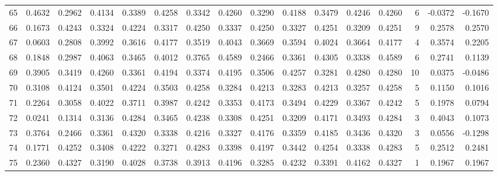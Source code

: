 \begin{tabular}{lrrrrrrrrrrrrrrr}
65  &      0.4632 &  0.2962 &  0.4134 &  0.3389 &  0.4258 &  0.3342 &  0.4260 &  0.3290 &  0.4188 &  0.3479 &   0.4246 &     0.4260 &      6 &                   -0.0372 &                    -0.1670 \\
66  &      0.1673 &  0.4243 &  0.3324 &  0.4224 &  0.3317 &  0.4250 &  0.3337 &  0.4250 &  0.3327 &  0.4251 &   0.3209 &     0.4251 &      9 &                    0.2578 &                     0.2570 \\
67  &      0.0603 &  0.2808 &  0.3992 &  0.3616 &  0.4177 &  0.3519 &  0.4043 &  0.3669 &  0.3594 &  0.4024 &   0.3664 &     0.4177 &      4 &                    0.3574 &                     0.2205 \\
68  &      0.1848 &  0.2987 &  0.4063 &  0.3465 &  0.4012 &  0.3765 &  0.4589 &  0.2466 &  0.3361 &  0.4305 &   0.3338 &     0.4589 &      6 &                    0.2741 &                     0.1139 \\
69  &      0.3905 &  0.3419 &  0.4260 &  0.3361 &  0.4194 &  0.3374 &  0.4195 &  0.3506 &  0.4257 &  0.3281 &   0.4280 &     0.4280 &     10 &                    0.0375 &                    -0.0486 \\
70  &      0.3108 &  0.4124 &  0.3501 &  0.4224 &  0.3503 &  0.4258 &  0.3284 &  0.4213 &  0.3283 &  0.4213 &   0.3257 &     0.4258 &      5 &                    0.1150 &                     0.1016 \\
71  &      0.2264 &  0.3058 &  0.4022 &  0.3711 &  0.3987 &  0.4242 &  0.3353 &  0.4173 &  0.3494 &  0.4229 &   0.3367 &     0.4242 &      5 &                    0.1978 &                     0.0794 \\
72  &      0.0241 &  0.1314 &  0.3136 &  0.4284 &  0.3465 &  0.4238 &  0.3308 &  0.4251 &  0.3209 &  0.4171 &   0.3493 &     0.4284 &      3 &                    0.4043 &                     0.1073 \\
73  &      0.3764 &  0.2466 &  0.3361 &  0.4320 &  0.3338 &  0.4216 &  0.3327 &  0.4176 &  0.3359 &  0.4185 &   0.3436 &     0.4320 &      3 &                    0.0556 &                    -0.1298 \\
74  &      0.1771 &  0.4252 &  0.3408 &  0.4222 &  0.3271 &  0.4283 &  0.3398 &  0.4197 &  0.3442 &  0.4254 &   0.3338 &     0.4283 &      5 &                    0.2512 &                     0.2481 \\
75  &      0.2360 &  0.4327 &  0.3190 &  0.4028 &  0.3738 &  0.3913 &  0.4196 &  0.3285 &  0.4232 &  0.3391 &   0.4162 &     0.4327 &      1 &                    0.1967 &                     0.1967 \\

\end{tabular}
